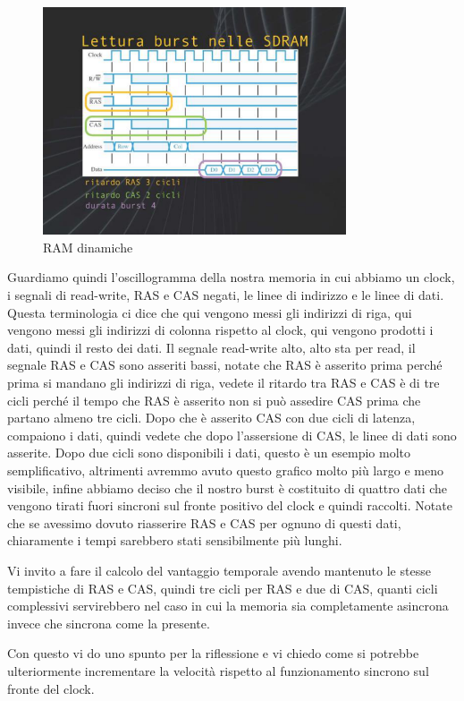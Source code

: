 \FloatBarrier
\begin{figure}[H]
  \centering
  \includegraphics[width=0.80\textwidth,
                    trim=40 40 40 30, %
                    clip]
                    {images/Lez04_p06_fig_05.png}
  \caption{RAM dinamiche}
  \label{fig:Lez04_p06_fig_05}
\end{figure}
\FloatBarrier
\noindent

Guardiamo quindi l'oscillogramma della nostra memoria in cui abbiamo un clock, i segnali di read-write, RAS e CAS negati, le linee di indirizzo e le linee di dati.
Questa terminologia ci dice che qui vengono messi gli indirizzi di riga, qui vengono messi gli indirizzi di colonna rispetto al clock, qui vengono prodotti i dati, quindi il resto dei dati.
Il segnale read-write alto, alto sta per read, il segnale RAS e CAS sono asseriti bassi, notate che RAS è asserito prima perché prima si mandano gli indirizzi di riga, vedete il ritardo tra RAS e CAS è di tre cicli perché il tempo che RAS è asserito non si può assedire CAS prima che partano almeno tre cicli.
Dopo che è asserito CAS con due cicli di latenza, compaiono i dati, quindi vedete che dopo l'assersione di CAS, le linee di dati sono asserite.
Dopo due cicli sono disponibili i dati, questo è un esempio molto semplificativo, altrimenti avremmo avuto questo grafico molto più largo e meno visibile, infine abbiamo deciso che il nostro burst è costituito di quattro dati che vengono tirati fuori sincroni sul fronte positivo del clock e quindi raccolti.
Notate che se avessimo dovuto riasserire RAS e CAS per ognuno di questi dati, chiaramente i tempi sarebbero stati sensibilmente più lunghi.

Vi invito a fare il calcolo del vantaggio temporale avendo mantenuto le stesse tempistiche di RAS e CAS, quindi tre cicli per RAS e due di CAS, quanti cicli complessivi servirebbero nel caso in cui la memoria sia completamente asincrona invece che sincrona come la presente.

Con questo vi do uno spunto per la riflessione e vi chiedo come si potrebbe ulteriormente incrementare la velocità rispetto al funzionamento sincrono sul fronte del clock.
